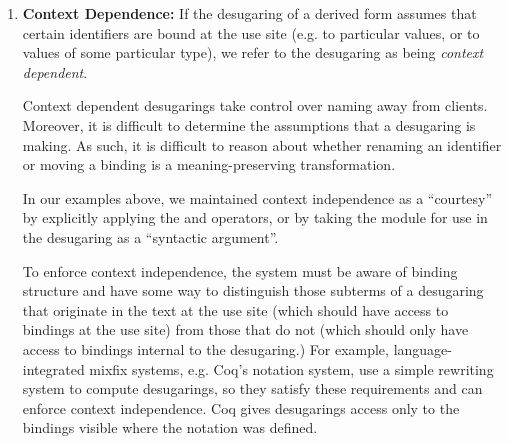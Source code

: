 {\begin{enumerate}
To enforce a prohibition on shadowing, the system must be integrated into or otherwise made aware of the binding structure of the language. For example, some of the language-integrated mixfix systems discussed above, e.g. Coq's notation system \cite{Coq:manual}, enforce a prohibition on shadowing by alpha-renaming desugarings as necessary. Erdweg et al. have developed a formalism for directly describing the ``binding structure'' of program text, as well as contextual transformations that use these descriptions to rename the identifiers that appear in a desugaring (and more generally, a rewriting) to avoid shadowing \cite{conf/ecoop/ErdwegSD14,conf/sle/RitschelE15}.\footnote{These papers refer to this property as ``capture avoidance''. We use the term ``shadowing'' rather than ``capture'' because ``capture'' has several incompatible meanings in the literature.}

\item \textbf{Context Dependence:} If the desugaring of a derived form assumes that certain identifiers are bound at the use site (e.g. to particular values, or to values of some particular type), we refer to the desugaring as being \emph{context dependent}. 


Context dependent desugarings take control over naming away from clients. Moreover, it is difficult to determine the assumptions that a desugaring is making. As such, it is difficult to reason about whether renaming an identifier or moving a binding is a meaning-preserving transformation. 

In our examples above, we maintained context independence as a ``courtesy'' by explicitly applying the  and  operators, or by taking the module for use in the desugaring as a ``syntactic argument''. 

To enforce context independence, the system must be aware of binding structure and have some way to distinguish those subterms of a desugaring that originate in the text at the use site (which should have access to bindings at the use site) from those that do not (which should only have access to bindings internal to the desugaring.) 
For example, language-integrated mixfix systems, e.g. Coq's notation system, use a simple rewriting system to compute desugarings, so they satisfy these requirements and can enforce context independence. Coq gives desugarings access only to the bindings visible where the notation was defined.


\end{enumerate}}
